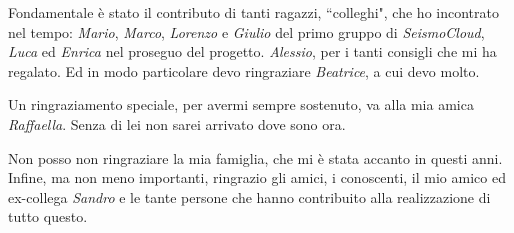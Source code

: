 \documentclass[a4paper,10pt]{memoir}
\begin{document}
\medskip

Fondamentale è stato il contributo di tanti ragazzi, ``colleghi", che ho incontrato nel tempo: \textit{Mario}, \textit{Marco}, \textit{Lorenzo} e \textit{Giulio} del primo gruppo di \textit{SeismoCloud}, \textit{Luca} ed \textit{Enrica} nel proseguo del progetto. \textit{Alessio}, per i tanti consigli che mi ha regalato. Ed in modo particolare devo ringraziare \textit{Beatrice}, a cui devo molto.

\medskip

Un ringraziamento speciale, per avermi sempre sostenuto, va alla mia amica \textit{Raffaella}. Senza di lei non sarei arrivato dove sono ora.

\medskip

Non posso non ringraziare la mia famiglia, che mi è stata accanto in questi anni. Infine, ma non meno importanti, ringrazio gli amici, i conoscenti, il mio amico ed ex-collega \textit{Sandro} e le tante persone che hanno contribuito alla realizzazione di tutto questo.

\cleardoublepage

\end{document}
